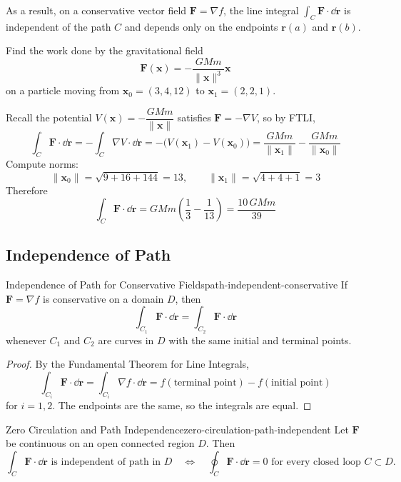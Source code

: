 As a result, on a conservative vector field $\mathbf{F} = \nabla f$, the line integral $\int_C \mathbf{F}\cdot \dd{\mathbf{r}}$ is
independent of the path $C$ and depends only on the endpoints $\mathbf{r}(a)$ and $\mathbf{r}(b)$.

\begin{example}
  Find the work done by the gravitational field
  \[
    \mathbf{F}(\mathbf{x}) = -\frac{GMm}{\lVert\mathbf{x}\rVert^3}\mathbf{x}
  \]
  on a particle moving from $\mathbf{x}_0 = (3,4,12)$ to $\mathbf{x}_1 = (2,2,1)$.

  Recall the potential $V(\mathbf{x}) = -\dfrac{GMm}{\lVert\mathbf{x}\rVert}$ satisfies $\mathbf{F} = -\nabla V$, so by FTLI,
  \[
    \int_C \mathbf{F}\cdot \dd{\mathbf{r}}
    = -\int_C \nabla V\cdot \dd{\mathbf{r}}
    = -\bigl(V(\mathbf{x}_1) - V(\mathbf{x}_0)\bigr)
    = \frac{GMm}{\lVert\mathbf{x}_1\rVert} - \frac{GMm}{\lVert\mathbf{x}_0\rVert}
  \]
  Compute norms:
  \[
    \lVert\mathbf{x}_0\rVert = \sqrt{9+16+144} = 13,\qquad
    \lVert\mathbf{x}_1\rVert = \sqrt{4+4+1} = 3
  \]
  Therefore
  \[
    \int_C \mathbf{F}\cdot \dd{\mathbf{r}}
    = GMm\left(\frac{1}{3} - \frac{1}{13}\right)
    = \frac{10\,GMm}{39}
  \]
\end{example}

\subsection{Independence of Path}

\begin{theorem}{Independence of Path for Conservative Fields}{path-independent-conservative}
  If $\mathbf{F} = \nabla f$ is conservative on a domain $D$, then
  \[
    \int_{C_1}\mathbf{F}\cdot \dd{\mathbf{r}}
    =
    \int_{C_2}\mathbf{F}\cdot \dd{\mathbf{r}}
  \]
  whenever $C_1$ and $C_2$ are curves in $D$ with the same initial and terminal points.
\end{theorem}

\begin{proof}
  By the Fundamental Theorem for Line Integrals,
  \[
    \int_{C_i}\mathbf{F}\cdot \dd{\mathbf{r}}
    =
    \int_{C_i}\nabla f\cdot \dd{\mathbf{r}}
    =
    f(\text{terminal point}) - f(\text{initial point})
  \]
  for $i=1,2$. The endpoints are the same, so the integrals are equal.
\end{proof}

\begin{theorem}{Zero Circulation and Path Independence}{zero-circulation-path-independent}
  Let $\mathbf{F}$ be continuous on an open connected region $D$. Then
  \[
    \int_C \mathbf{F}\cdot \dd{\mathbf{r}}
    \text{ is independent of path in }D
    \quad\Longleftrightarrow\quad
    \oint_C \mathbf{F}\cdot \dd{\mathbf{r}} = 0
    \text{ for every closed loop }C\subset D.
  \]
\end{theorem}

